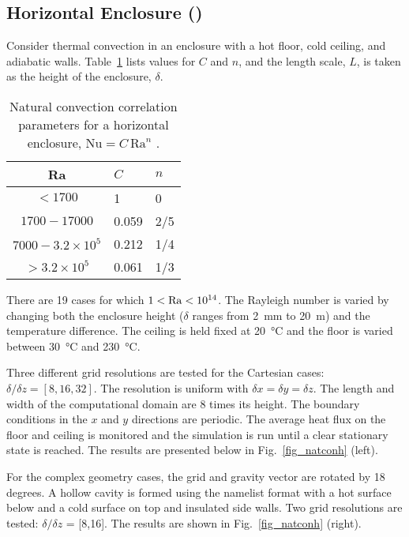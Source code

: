 \documentclass[11pt]{book}
\begin{document}
\FloatBarrier


\subsection{Horizontal Enclosure (\texorpdfstring{}{natconh})}
\label{sec:natconh}

Consider thermal convection in an enclosure with a hot floor, cold ceiling, and adiabatic walls. Table~\ref{tab:freeconh} lists values for $C$ and $n$, and the length scale, $L$, is taken as the height of the enclosure, $\delta$.
\begin{table}[h]
\centering
\caption[Natural convection correlation parameters for a horizontal enclosure]{Natural convection correlation parameters for a horizontal enclosure, $\mathrm{Nu}=C \, \mathrm{Ra}^n$ \cite{Holman:2}.}
\label{tab:freeconh}
\begin{tabular}{cll}
Ra                       & $C$    & $n$ \\
\hline
$<1700$                  & 1      & 0   \\
$1700 - 17000$           & 0.059  & 2/5 \\
$7000 - 3.2 \times 10^5$ & 0.212  & 1/4 \\
$>3.2 \times 10^5$       & 0.061  & 1/3
\end{tabular}
\end{table}
There are 19 cases for which $1 < {\rm Ra} < 10^{14}$.  The Rayleigh number is varied by changing both the enclosure height ($\delta$ ranges from 2~mm to 20~m) and the temperature difference.  The ceiling is held fixed at 20~\si{\degreeCelsius} and the floor is varied between 30~\si{\degreeCelsius} and 230~\si{\degreeCelsius}.

Three different grid resolutions are tested for the Cartesian cases: $\delta/\delta z = [8,16,32]$.  The resolution is uniform with $\delta x = \delta y = \delta z$.  The length and width of the computational domain are 8 times its height. The boundary conditions in the $x$ and $y$ directions are periodic. The average heat flux on the floor and ceiling is monitored and the simulation is run until a clear stationary state is reached.  The results are presented below in Fig.~\ref{fig_natconh} (left).

For the complex geometry cases, the grid and gravity vector are rotated by 18 degrees.  A hollow cavity is formed using the  namelist format with a hot surface below and a cold surface on top and insulated side walls.  Two grid resolutions are tested: $\delta/\delta z$ = [8,16].  The results are shown in Fig.~\ref{fig_natconh} (right).
\end{document}
